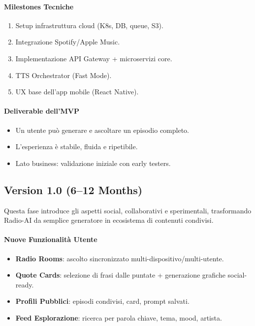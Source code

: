 \documentclass[11pt,a4paper]{article}
\begin{document}
\paragraph{Milestones Tecniche}
\begin{enumerate}
    \item Setup infrastruttura cloud (K8s, DB, queue, S3).
    \item Integrazione Spotify/Apple Music.
    \item Implementazione API Gateway + microservizi core.
    \item TTS Orchestrator (Fast Mode).
    \item UX base dell’app mobile (React Native).
\end{enumerate}

\paragraph{Deliverable dell’MVP}
\begin{itemize}
    \item Un utente può generare e ascoltare un episodio completo.
    \item L’esperienza è stabile, fluida e ripetibile.
    \item Lato business: validazione iniziale con early testers.
\end{itemize}


\subsection{Version 1.0 (6--12 Months)}

Questa fase introduce gli aspetti social, collaborativi e sperimentali, trasformando Radio-AI da semplice generatore in ecosistema di contenuti condivisi.

\paragraph{Nuove Funzionalità Utente}
\begin{itemize}
    \item \textbf{Radio Rooms}: ascolto sincronizzato multi-dispositivo/multi-utente.
    \item \textbf{Quote Cards}: selezione di frasi dalle puntate + generazione grafiche social-ready.
    \item \textbf{Profili Pubblici}: episodi condivisi, card, prompt salvati.
    \item \textbf{Feed Esplorazione}: ricerca per parola chiave, tema, mood, artista.
\end{itemize}
\end{document}
